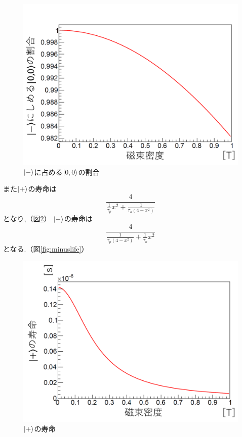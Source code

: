 \begin{figure}[H]
\centering
\includegraphics[keepaspectratio,scale=0.5]{fig/ybm/minusstate.pdf}
\caption{$\ket{-}$に占める$\ket{0,0}$の割合}
\label{fig:minusstate}
\end{figure}

また$\ket{+}$の寿命は
\begin{equation}
	\nonumber
\frac{4}{\frac{1}{\tau_{p}}x^{2}+\frac{1}{\tau_{o}(4-x^{2})}}
\end{equation}
となり,（図\ref{fig:pluslife}）
$\ket{-}$の寿命は
\begin{equation}
	\nonumber
\frac{4}{\frac{1}{\tau_{p}(4-x^{2})}+\frac{1}{\tau_{o}}x^{2}}
\end{equation}
となる.（図\ref{fig:minuslife}）

\begin{figure}[H]
\centering
\includegraphics[keepaspectratio,scale=0.5]{fig/ybm/pluslife.pdf}
\caption{$\ket{+}$の寿命}
\label{fig:pluslife}
\end{figure}

